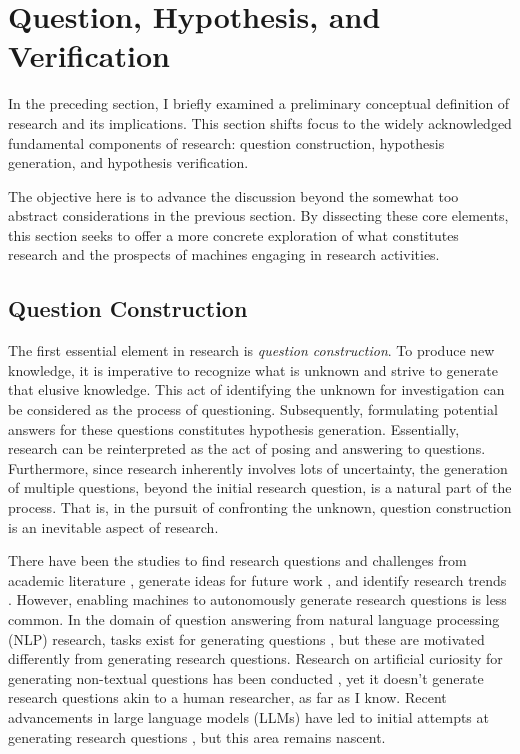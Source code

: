 \section{Question, Hypothesis, and  Verification}
\label{section-question-hypothesis-verification}
In the preceding section, I briefly examined a preliminary conceptual definition of research and its implications. This section shifts focus to the widely acknowledged fundamental components of research: question construction, hypothesis generation, and hypothesis verification. 

The objective here is to advance the discussion beyond the somewhat too abstract considerations in the previous section. By dissecting these core elements, this section seeks to offer a more concrete exploration of what constitutes research and the prospects of machines engaging in research activities. 

\subsection{Question Construction}
\label{section-question-construction}
The first essential element in research is \textit{question construction}. To produce new knowledge, it is imperative to recognize what is unknown and strive to generate that elusive knowledge. This act of identifying the unknown for investigation can be considered as the process of questioning. Subsequently, formulating potential answers for these questions constitutes hypothesis generation. Essentially, research can be reinterpreted as the act of posing and answering to questions. Furthermore, since research inherently involves lots of uncertainty, the generation of multiple questions, beyond the initial research question, is a natural part of the process. That is, in the pursuit of confronting the unknown, question construction is an inevitable aspect of research.

There have been the studies to find research questions and challenges from academic literature \cite{lahav2022search,oppenlaender2023mapping,surita2020can}, generate ideas for future work \cite{wang2019paperrobot}, and identify research trends \cite{krenn2020predicting,krenn2022predicting}. However, enabling machines to autonomously generate research questions is less common. In the domain of question answering from natural language processing (NLP) research, tasks exist for generating questions \cite{pan2019recent,zhang2021review}, but these are motivated differently from generating research questions. Research on artificial curiosity for generating non-textual questions has been conducted \cite{schmidhuber1991possibility}, yet it doesn't generate research questions akin to a human researcher, as far as I know. Recent advancements in large language models (LLMs) have led to initial attempts at generating research questions \cite{liu2023creative,lahat2023evaluating}, but this area remains nascent.

